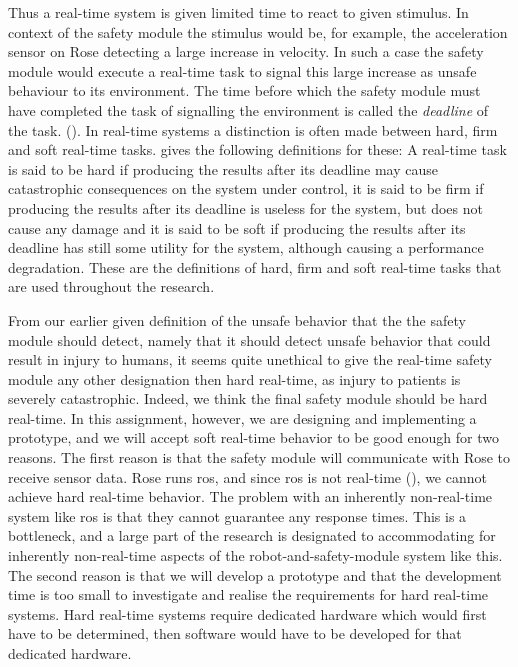 \documentclass[12pt]{scrreprt}
\begin{document}
Thus a real-time system is given limited time to react to given stimulus. In context of the safety module the stimulus would be, for example, the acceleration sensor on Rose detecting a large increase in velocity. In such a case the safety module would execute a real-time task to signal this large increase as unsafe behaviour to its environment. The time before which the safety module must have completed the task of signalling the environment is called the \textit{deadline} of the task. (\cite{realtime_systems}). In real-time systems a distinction is often made between hard, firm and soft real-time tasks. \cite{buttazo} gives the following definitions for these: A real-time task is said to be hard if producing the results after its deadline
may cause catastrophic consequences on the system under control, it is said to be firm if producing the results after its deadline is useless for the system, but does not cause any damage and it is said to be soft if producing the results after its deadline has still some utility for the system, although causing a performance degradation. These are the definitions of hard, firm and soft real-time tasks that are used throughout the research.
\par
From our earlier given definition of the unsafe behavior that the the safety module should detect, namely that it should detect unsafe behavior that could result in injury to humans, it seems quite unethical to give the real-time safety module any other designation then hard real-time, as injury to patients is severely catastrophic. Indeed, we think the final safety module should be hard real-time. In this assignment, however, we are designing and implementing a prototype, and we will accept soft real-time behavior to be good enough for two reasons. The first reason is that the safety module will communicate with Rose to receive sensor data. Rose runs \acrfull{ros}, and since \acrlong{ros} is not real-time (\cite{why_is_ros_not_realtime}), we cannot achieve hard real-time behavior. The problem with an inherently non-real-time system like \acrlong{ros} is that they cannot guarantee any response times. This is a bottleneck, and a large part of the research is designated to accommodating for inherently non-real-time aspects of the robot-and-safety-module system like this. The second reason is that we will develop a prototype and that the development time is too small to investigate and realise the requirements for hard real-time systems. Hard real-time systems require dedicated hardware which would first have to be determined, then software would have to be developed for that dedicated hardware.
\end{document}
